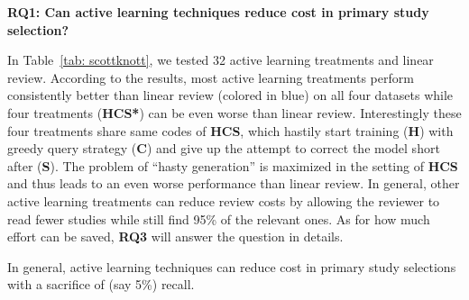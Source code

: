 \documentclass{svjour3}
\theoremstyle{break}
\begin{document}





{\bf RQ1: Can active learning techniques reduce cost in primary study selection?} 

In Table~\ref{tab: scottknott}, we tested 32 active learning treatments and linear review. According to the results, most active learning treatments perform consistently better than linear review (colored in {\setlength{\fboxsep}{1pt}\colorbox{blue!50}{blue}}) on all four datasets while four treatments (\textbf{HCS*}) can be even worse than linear review. Interestingly these four treatments share same codes of \textbf{HCS}, which hastily start training (\textbf{H}) with greedy query strategy (\textbf{C}) and give up the attempt to correct the model short after (\textbf{S}). The problem of ``hasty generation'' is maximized in the setting of \textbf{HCS} and thus leads to an even worse performance than linear review. In general, other active learning treatments can reduce review costs by allowing the reviewer to read fewer studies while still find 95\% of the relevant ones. As for how much effort can be saved, \textbf{RQ3} will answer the question in details.

\begin{lesson}
    In general, active learning techniques can reduce cost in primary study selections with a sacrifice of (say 5\%) recall.
\end{lesson}
\end{document}
